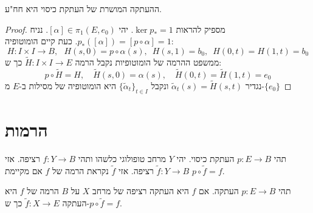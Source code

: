 \documentclass{tstextbook}
\begin{document}
\begin{proposition}
ההעתקה המושרת של העתקת כיסוי היא חח"ע.

\end{proposition}
\begin{proof}
מספיק להראות \(\ker p_{*}={1}\). יהי \([\alpha]\in\pi_{1}(E,e_{0})\). נניח \(p_{*}([\alpha])=[p\circ\alpha]=1\). כעת קיים הומוטופיה:
$$H:I\times I\to B,\ \ \ H(s,0)=p\circ\alpha(s),\,\,\,H(s,1)=b_{0},\,\,\,H(0,t)=H(1,t)=b_{0}$$
ממשפט ההרמה של הומוטופיות נקבל הרמה \({\widetilde{H}}:I\times I\to E\) כך ש:
$$p\circ\widetilde{H}=H,\quad\widetilde{H}(s,0)=\alpha(s),\quad\widetilde{H}(0,t)=\widetilde{H}(1,t)=e_{0}$$
נגדיר \(\widetilde\alpha_{t}(s)=\widetilde H(s,t)\) ונקבל \(\{\widetilde\alpha_{t}\}_{t\in I}\) היא הומוטופיה של מסילות ב-\(E\) מ-\(\{ e_{0} \}\)

\end{proof}
\section{הרמות}

\begin{definition}[הרמה]
תהי \(p:E\to B\) העתקת כיסוי. יהי \(Y\) מרחב טופולוגי כלשהו ותהי \(f:Y\to B\) רציפה. אזי \(\tilde{f}:Y\to B\) רציפה. אזי \(\tilde{f}\) נקראת הרמה של \(f\) אם מקיימת \(p\circ \tilde{f}=f\).

\end{definition}
תהי \(p:E\to B\) העתקה. אם \(f\) היא העתקה רציפה של מרחב \(X\) על \(B\) הרמה של \(f\) היא העתקה \(\tilde{f}:X\to E\) כך ש-\(p\circ\tilde{f} = f\).
\end{document}
